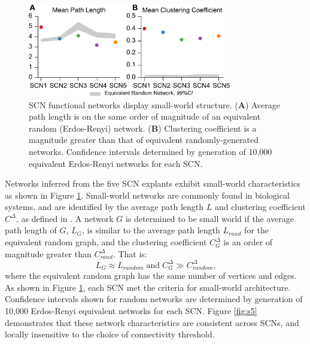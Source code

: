 \begin{figure}[p]
    \begin{center}
        \includegraphics[width=3.5in]{chap3/figures/fig3.pdf}
    \end{center}
    \caption{\label{fig:mcs} SCN functional networks display small-world structure. (\textbf{A}) Average path length is on the same order of magnitude of an equivalent random (Erdos-Renyi) network. (\textbf{B}) Clustering coefficient is a magnitude greater than that of equivalent randomly-generated networks. Confidence intervals determined by generation of 10,000 equivalent Erdos-Renyi networks for each SCN.
}
\end{figure}


Networks inferred from the five SCN explants exhibit small-world characteristics as shown in Figure \ref{fig:mcs}.
Small-world networks are commonly found in biological systems, and are identified by the average path length $L$ and clustering coefficient $C^\Delta$, as defined in \cite{Watts1998, Newman2000}.
A network $G$ is determined to be small world if the average path length of $G$, $L_G$, is similar to the average path length $L_{rand}$ for the equivalent random graph, and the clustering coefficient $C^\Delta_G$ is an order of magnitude greater than $C^\Delta_{rand}$. That is:
\begin{equation} 
	L_{G} \approx L_{random} \; 
	\mbox{and} \; 
	C^{\Delta}_{G} \gg C^\Delta_{random}  \mbox{,}
\end{equation} 
where the equivalent random graph has the same number of vertices and edges.
As shown in Figure \ref{fig:mcs}, each SCN met the criteria for small-world architecture.
Confidence intervals shown for random networks are determined by generation of 10,000 Erdos-Renyi equivalent networks for each SCN.
Figure \ref{fig:s5} demonstrates that these network characteristics are consistent across SCNs, and locally insensitive to the choice of connectivity threshold.

